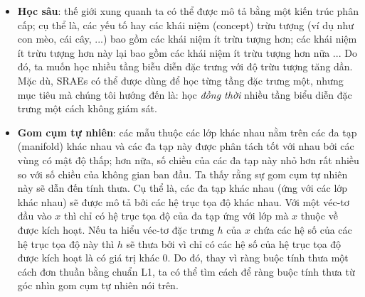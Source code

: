 \begin{itemize}
	\item \textbf{Học sâu}: thế giới xung quanh ta có thể được mô tả bằng một kiến trúc phân cấp; cụ thể là, các yếu tố hay các khái niệm (concept) trừu tượng (ví dụ như con mèo, cái cây, ...) bao gồm các khái niệm ít trừu tượng hơn; các khái niệm ít trừu tượng hơn này lại bao gồm các khái niệm ít trừu tượng hơn nữa ... Do đó, ta muốn học nhiều tầng biễu diễn đặc trưng với độ trừu tượng tăng dần. Mặc dù, SRAEs có thể được dùng để học từng tầng đặc trưng một, nhưng mục tiêu mà chúng tôi hướng đến là: học \emph{đồng thời} nhiều tầng biểu diễn đặc trưng một cách không giám sát.
	\item \textbf{Gom cụm tự nhiên}: các mẫu thuộc các lớp khác nhau nằm trên các đa tạp (manifold) khác nhau và các đa tạp này được phân tách tốt với nhau bởi các vùng có mật độ thấp; hơn nữa, số chiều của các đa tạp này nhỏ hơn rất nhiều so với số chiều của không gian ban đầu. Ta thấy rằng sự gom cụm tự nhiên này sẽ dẫn đến tính thưa. Cụ thể là, các đa tạp khác nhau (ứng với các lớp khác nhau) sẽ được mô tả bởi các hệ trục tọa độ khác nhau. Với một véc-tơ đầu vào $x$ thì chỉ có hệ trục tọa độ của đa tạp ứng với lớp mà $x$ thuộc về được kích hoạt. Nếu ta hiểu véc-tơ đặc trưng $h$ của $x$ chứa các hệ số của các hệ trục tọa độ này thì $h$ sẽ thưa bởi vì chỉ có các hệ số của hệ trục tọa độ được kích hoạt là có giá trị khác 0. Do đó, thay vì ràng buộc tính thưa một cách đơn thuần bằng chuẩn L1, ta có thể tìm cách để ràng buộc tính thưa từ góc nhìn gom cụm tự nhiên nói trên.
\end{itemize} 


